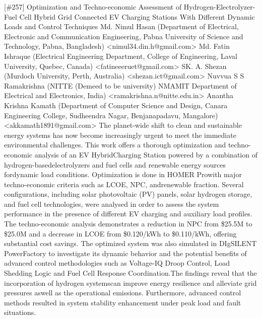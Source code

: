  {} \begin{abstract_online} {[\#257] Optimization and Techno-economic Assessment of Hydrogen-Electrolyzer-Fuel Cell Hybrid Grid Connected EV Charging Stations With Different Dynamic Loads and Control Techniques} {} {Md. Nimul Hasan (Department of Electrical, Electronic and Communication Engineering, Pabna University of Science and Technology, Pabna, Bangladesh) <nimul34.din.h@gmail.com> 
Md. Fatin Ishraque (Electrical Engineering Department, College of Engineering, Laval University, Quebec, Canada) <fatineeeruet@gmail.com> 
SK. A. Shezan (Murdoch University, Perth, Australia) <shezan.ict@gmail.com> 
Nuvvua S S Ramakrishna (NITTE (Demeed to be university) NMAMIT Department of Electrical and Electronics, India) <ramakrishna.n@nitte.edu.in> 
Anantha Krishna Kamath (Department of Computer Science and Design, Canara Engineering College, Sudheendra Nagar, Benjanapadavu, Mangalore) <akkamath1891@gmail.com> } {} The planet-wide shift to clean and sustainable energy systems has now become increasingly urgent to meet the immediate environmental challenges. This work offers a thorough optimization and techno-economic analysis of an EV HybridCharging Station powered by a combination of hydrogen-basedelectrolyzers and fuel cells and renewable energy sources fordynamic load conditions. Optimization is done in HOMER Prowith major techno-economic criteria such as LCOE, NPC, andrenewable fraction. Several configurations, including solar photovoltaic (PV) panels, solar hydrogen storage, and fuel cell technologies, were analysed in order to assess the system performance in the presence of different EV charging and auxiliary load profiles. The techno-economic analysis demonstrates a reduction in NPC from \$25.5M to \$25.0M and a decrease in LCOE from \$0.120/kWh to \$0.110/kWh, offering substantial cost savings. The optimized system was also simulated in DIgSILENT PowerFactory to investigate its dynamic behavior and the potential benefits of advanced control methodologies such as Voltage-IQ Droop Control, Load Shedding Logic and Fuel Cell Response Coordination.The findings reveal that the incorporation of hydrogen systemscan improve energy resilience and alleviate grid pressures aswell as the operational emissions. Furthermore, advanced control methods resulted in system stability enhancement under peak load and fault situations. \end{abstract_online}  

